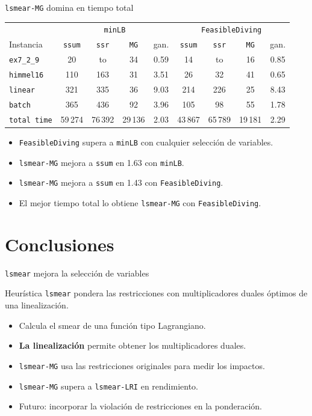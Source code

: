 \documentclass[10pt,aspectratio=169]{beamer}
\begin{document}
\begin{frame}{\texttt{lsmear-MG} domina en tiempo total}
\small
\begin{center}
\begin{tabular}{@{}lcccccccc@{}}
\toprule
& \multicolumn{4}{c}{\texttt{minLB}} & \multicolumn{4}{c}{\texttt{FeasibleDiving}} \\
Instancia & \texttt{ssum} & \texttt{ssr} & \texttt{MG} & gan. & \texttt{ssum} & \texttt{ssr} & \texttt{MG} & gan. \\
\midrule
\texttt{ex7\_2\_9}  & 20 & to & 34 & 0.59 & \alert{14} & to & 16 & 0.85 \\
\texttt{himmel16}   & 110 & 163 & 31 & 3.51 & \alert{26} & 32 & 41 & 0.65 \\
\texttt{linear}     & 321 & 335 & 36 & 9.03 & 214 & 226 & \alert{25} & 8.43 \\
\texttt{batch}      & 365 & 436 & 92 & 3.96 & 105 & 98 & \alert{55} & 1.78 \\
\texttt{total time} & 59\,274 & 76\,392 & \alert{29\,136} & 2.03 & 43\,867 & 65\,789 & \alert{19\,181} & 2.29 \\
\bottomrule
\end{tabular}
\end{center}

\begin{itemize}
  \item \texttt{FeasibleDiving} supera a \texttt{minLB} con cualquier selección de variables.
  \item \texttt{lsmear-MG} mejora a \texttt{ssum} en 1.63 con \texttt{minLB}.
  \item \texttt{lsmear-MG} mejora a \texttt{ssum} en 1.43 con \texttt{FeasibleDiving}.
  \item El mejor tiempo total lo obtiene \texttt{lsmear-MG} con \texttt{FeasibleDiving}.
\end{itemize}
\end{frame}

\section{Conclusiones}

\begin{frame}{\texttt{lsmear} mejora la selección de variables}
\small
\begin{block}{Heurística}
\texttt{lsmear} pondera las restricciones con multiplicadores duales óptimos de una linealización.
\end{block}

\begin{itemize}
  \item Calcula el smear de una función tipo Lagrangiano.
  \item \textbf{La linealización} permite obtener los multiplicadores duales.
  \item \texttt{lsmear-MG} usa las restricciones originales para medir los impactos.
  \item \alert{\texttt{lsmear-MG}} supera a \texttt{lsmear-LRI} en rendimiento.
  \item Futuro: incorporar la violación de restricciones en la ponderación.
\end{itemize}
\end{frame}
\end{document}
